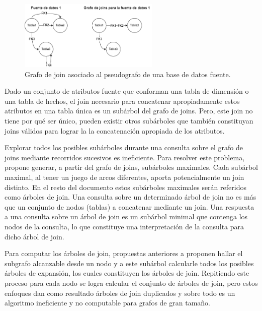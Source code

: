 \begin{figure}
    \centering
    \includegraphics[width=0.60\textwidth]{Graphics/graph join transformation.drawio.png}
    \caption{Grafo de join asociado al pseudografo de una base de datos fuente.}
    \label{fig:joingraphobtention}
\end{figure}

Dado un conjunto de atributos fuente que conforman una tabla de dimensión o una tabla de hechos, el join necesario 
para concatenar apropiadamente estos atributos en una tabla \'unica es un sub\'arbol del grafo de joins. Pero, este join no tiene 
por qu\'e ser \'unico, pueden existir otros sub\'arboles que también constituyan joins válidos para lograr 
la la concatenación apropiada de los atributos. 

Explorar todos los posibles sub\'arboles durante una consulta sobre el grafo de joins mediante 
recorridos sucesivos es ineficiente. Para resolver este problema, \cite{mason2005autojoin} propone 
generar, a partir del grafo de joins, sub\'arboles maximales. Cada sub\'arbol maximal, al tener un juego 
de arcos diferentes, aporta potencialmente un join distinto. En el resto del documento estos sub\'arboles 
maximales ser\'an referidos como \'arboles de join. Una consulta sobre un determinado \'arbol de join no es m\'as que 
un conjunto de nodos (tablas) a concatenar mediante un join. Una respuesta a una consulta sobre un \'arbol de join es un sub\'arbol 
minimal que contenga los nodos de la consulta, lo que constituye una interpretación 
de la consulta para dicho \'arbol de join.

Para computar los \'arboles de join, propuestas anteriores a \cite{mason2005autojoin} proponen hallar 
el subgrafo alcanzable desde un nodo y a este sub\'arbol calcularle todos los posibles \'arboles de 
expansión, los cuales constituyen los \'arboles de join. Repitiendo este proceso para 
cada nodo se logra 
calcular el conjunto de \'arboles de join, 
pero estos enfoques dan como resultado \'arboles de join duplicados y sobre todo 
es un algoritmo ineficiente y no computable para grafos de gran tamaño\cite{mason2005autojoin}.

